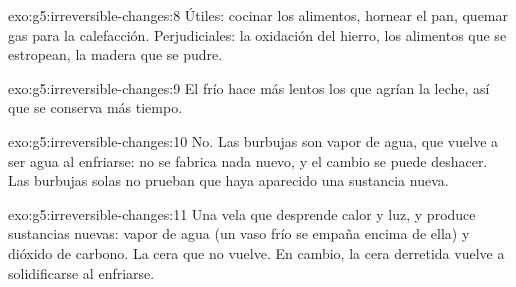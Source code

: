 \begin{solution}{exo:g5:irreversible-changes:8}
Útiles: cocinar los alimentos, hornear el pan, quemar gas para la
calefacción. Perjudiciales: la oxidación del hierro, los alimentos que
se estropean, la madera que se pudre.
\end{solution}

\begin{solution}{exo:g5:irreversible-changes:9}
El frío hace más lentos los  que agrían la leche, así
que se conserva más tiempo.
\end{solution}

\begin{solution}{exo:g5:irreversible-changes:10}
No. Las burbujas son vapor de agua, que vuelve a ser agua al enfriarse:
no se fabrica nada nuevo, y el cambio se puede deshacer. Las burbujas
solas no prueban que haya aparecido una sustancia nueva.
\end{solution}

\begin{solution}{exo:g5:irreversible-changes:11}
Una vela que  desprende calor y luz, y produce sustancias nuevas:
vapor de agua (un vaso frío se empaña encima de ella) y dióxido de
carbono. La cera que  no vuelve. En cambio, la cera derretida
vuelve a solidificarse al enfriarse.
\end{solution}
